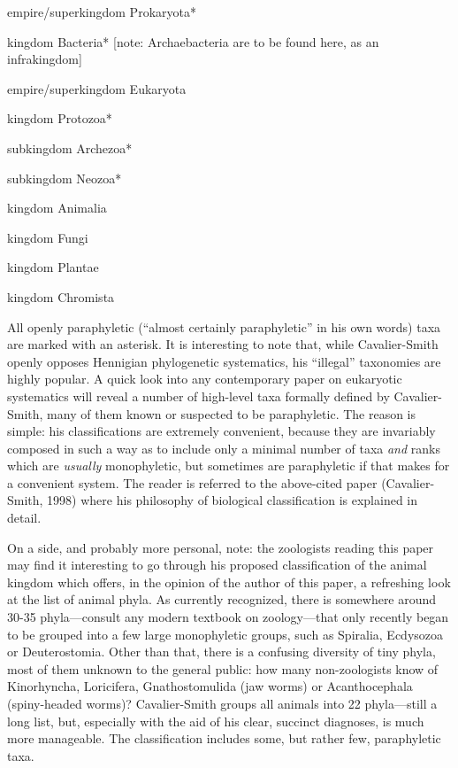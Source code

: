 \begin{artengenv}
\begin{longitemize}
\item empire/superkingdom Prokaryota*
\begin{longitemize}
\item kingdom Bacteria* [note: Archaebacteria are to be found here, as an infrakingdom]
\end{longitemize}
\item empire/superkingdom Eukaryota
\begin{longitemize}
\item kingdom Protozoa*
\begin{longitemize}
\item subkingdom Archezoa*
\item subkingdom Neozoa*
\end{longitemize}
\item kingdom Animalia
\item kingdom Fungi
\item kingdom Plantae
\item kingdom Chromista
\end{longitemize}
\end{longitemize}
All openly paraphyletic (``almost certainly paraphyletic'' in his own words) taxa are marked with an asterisk. It is
interesting to note that, while Cavalier-Smith openly opposes Hennigian phylogenetic systematics, his ``illegal''
taxonomies are highly popular. A quick look into any contemporary paper on eukaryotic systematics will reveal a number
of high-level taxa formally defined by Cavalier-Smith, many of them known or suspected to be paraphyletic. The reason
is simple: his classifications are extremely convenient, because they are invariably composed in such a way as to
include only a minimal number of taxa \textit{and} ranks which are \textit{usually }monophyletic, but sometimes are
paraphyletic if that makes for a convenient system. The reader is referred to the above-cited paper (Cavalier-Smith,
1998) where his philosophy of biological classification is explained in detail.

On a side, and probably more personal, note: the zoologists reading this paper may find it interesting to go through his
proposed classification of the animal kingdom
\parencite[pp.235–237]{cavalier-smith_revised_1998}
which offers,
in the opinion of the author of this paper, a refreshing look at the list of animal phyla. As currently recognized,
there is somewhere around 30-35 phyla---consult any modern textbook on zoology---that only recently began to be grouped
into a few large monophyletic groups, such as Spiralia, Ecdysozoa or Deuterostomia. Other than that, there is a
confusing diversity of tiny phyla, most of them unknown to the general public: how many non-zoologists know of
Kinorhyncha, Loricifera, Gnathostomulida (jaw worms) or Acanthocephala (spiny-headed worms)? Cavalier-Smith groups all
animals into 22 phyla---still a long list, but, especially with the aid of his clear, succinct diagnoses, is much more
manageable. The classification includes some, but rather few, paraphyletic taxa.


\end{artengenv}
